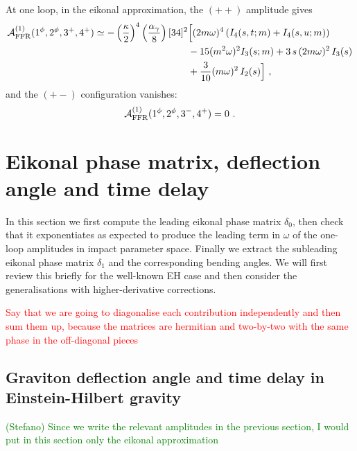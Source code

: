 \documentclass[a4paper,11pt]{article}
\numberwithin{equation}{section}
\newcommand{\sqr}[2]{\lbrack #1 #2 \rbrack}
\newcommand{\cA}{\mathcal{A}}
\def\cA{\mathcal{A}}
\begin{document}
At one loop, in the eikonal approximation, the $(++)$ amplitude gives
\begin{equation}
    \begin{split}
        \cA^{(1)}_{\rm FFR} (1^\phi , 2^\phi , 3^{+} , 4^{+}) \simeq - \left(\frac{\kappa}{2}\right)^4 \left(\frac{\alpha_\gamma}{8}\right) \sqr{3}{4}^2 &\Big[(2 m \omega)^4 \left(I_4 (s, t;m) + I_4 (s, u;m) \right)\\
        & -15 (m^2 \omega)^2 I_3 (s;m) + 3\, s \, (2m\omega)^2 \, I_3(s)  \\
        & +\frac{3}{10}(m\omega)^2 \, I_2(s)\Big]\ ,
    \end{split}
\end{equation}
and the $(+-)$ configuration  vanishes:
\begin{equation}
    \cA^{(1)}_{\rm FFR} (1^\phi , 2^\phi , 3^{-} , 4^{+}) = 0
    \ .
\end{equation}

\section{Eikonal phase matrix, deflection angle and time delay}

In this section we first compute the leading eikonal phase matrix $\delta_0$, then check that
it exponentiates as expected to produce the leading term in $\omega$ of the one-loop amplitudes in impact parameter space. Finally we extract the subleading eikonal phase matrix $\delta_1$ and the corresponding bending angles. We will first review this briefly for the well-known EH case and then consider the generalisations with higher-derivative corrections.

\textcolor{red}{Say that we are going to diagonalise each contribution independently and then sum them up, because the matrices are hermitian and two-by-two with the same phase in the off-diagonal pieces}

\subsection{Graviton deflection angle and time delay in Einstein-Hilbert gravity}


\textcolor{green}{(Stefano) Since we write the relevant amplitudes in the previous section, I would put in this section only the eikonal approximation}
\end{document}
